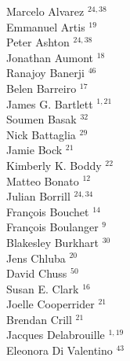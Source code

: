 \documentclass[PICOReport.tex]{subfiles}
\begin{document}
\footnotesize {

\begin{multicols}{4}
Marcelo Alvarez $^{24,38}$                 \\
Emmanuel Artis $^{19}$                  \\
Peter Ashton $^{24,38}$                    \\
Jonathan Aumont $^{18}$                 \\
Ranajoy Banerji $^{46}$                 \\
Belen Barreiro $^{17}$                  \\
James G. Bartlett $^{1,21}$               \\
Soumen Basak $^{32}$                    \\
Nick Battaglia $^{29}$                  \\
Jamie Bock $^{21}$                      \\
Kimberly K. Boddy $^{22}$               \\
Matteo Bonato $^{12}$                   \\
Julian Borrill $^{24,34}$                  \\
Fran\c{c}ois Bouchet $^{14}$            \\
Fran\c{c}ois Boulanger $^{9}$          \\
Blakesley Burkhart $^{30}$              \\
Jens Chluba $^{20}$                     \\
David Chuss $^{50}$                     \\
Susan E. Clark $^{16}$                  \\
Joelle Cooperrider $^{21}$              \\
Brendan Crill $^{21}$                   \\
Jacques Delabrouille $^{1,19}$            \\
Eleonora Di Valentino $^{43}$           \\

\end{multicols}}
\end{document}
